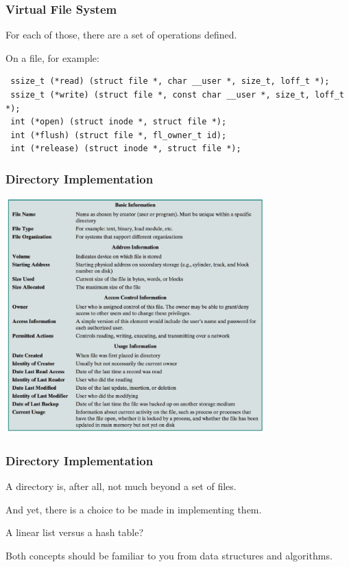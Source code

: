 \begin{frame}[fragile]
\frametitle{Virtual File System}

For each of those, there are a set of operations defined. 

On a file, for example:
{\scriptsize
\begin{verbatim}
 ssize_t (*read) (struct file *, char __user *, size_t, loff_t *);
 ssize_t (*write) (struct file *, const char __user *, size_t, loff_t *); 
 int (*open) (struct inode *, struct file *);
 int (*flush) (struct file *, fl_owner_t id);
 int (*release) (struct inode *, struct file *);
\end{verbatim}
}

\end{frame}

\begin{frame}
\frametitle{Directory Implementation}

\begin{center}
	\includegraphics[width=0.75\textwidth]{images/directory.png}
\end{center}

\end{frame}



\begin{frame}
\frametitle{Directory Implementation}

A directory is, after all, not much beyond a set of files. 

And yet, there is a choice to be made in implementing them.

A linear list versus a hash table? 

Both concepts should be familiar to you from data structures and algorithms.


\end{frame}

